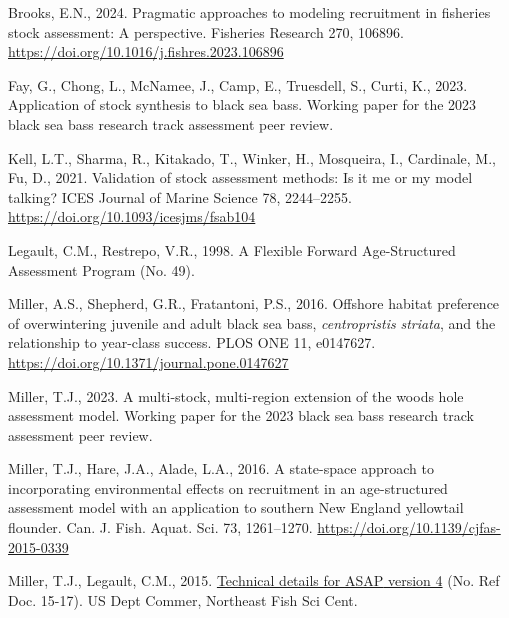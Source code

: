 \documentclass[
]{article}
\newlength{\cslhangindent}
\newlength{\cslentryspacingunit} %
\newenvironment{CSLReferences}[2] %
 {%
  \setlength{\parindent}{0pt}
  \ifodd #1
  \let\oldpar\par
  \def\par{\hangindent=\cslhangindent\oldpar}
  \fi
  \setlength{\parskip}{#2\cslentryspacingunit}
 }%
 {}
\begin{document}
\hypertarget{refs}{}
\begin{CSLReferences}{1}{0}
\leavevmode{}%
Brooks, E.N., 2024. Pragmatic approaches to modeling recruitment in fisheries stock assessment: A perspective. Fisheries Research 270, 106896. \url{https://doi.org/10.1016/j.fishres.2023.106896}

\leavevmode{}%
Fay, G., Chong, L., McNamee, J., Camp, E., Truesdell, S., Curti, K., 2023. Application of stock synthesis to black sea bass. Working paper for the 2023 black sea bass research track assessment peer review.

\leavevmode{}%
Kell, L.T., Sharma, R., Kitakado, T., Winker, H., Mosqueira, I., Cardinale, M., Fu, D., 2021. Validation of stock assessment methods: Is it me or my model talking? ICES Journal of Marine Science 78, 2244--2255. \url{https://doi.org/10.1093/icesjms/fsab104}

\leavevmode{}%
Legault, C.M., Restrepo, V.R., 1998. A {Flexible Forward Age}-{Structured Assessment Program} (No. 49).

\leavevmode{}%
Miller, A.S., Shepherd, G.R., Fratantoni, P.S., 2016. Offshore habitat preference of overwintering juvenile and adult black sea bass, \emph{centropristis} \emph{striata}, and the relationship to year-class success. {PLOS} {ONE} 11, e0147627. \url{https://doi.org/10.1371/journal.pone.0147627}

\leavevmode{}%
Miller, T.J., 2023. A multi-stock, multi-region extension of the woods hole assessment model. Working paper for the 2023 black sea bass research track assessment peer review.

\leavevmode{}%
Miller, T.J., Hare, J.A., Alade, L.A., 2016. A state-space approach to incorporating environmental effects on recruitment in an age-structured assessment model with an application to southern {New England} yellowtail flounder. Can. J. Fish. Aquat. Sci. 73, 1261--1270. \url{https://doi.org/10.1139/cjfas-2015-0339}

\leavevmode{}%
Miller, T.J., Legault, C.M., 2015. \href{https://doi:10.7289/V57W695G}{Technical details for {ASAP} version 4} (No. Ref Doc. 15-17). {US Dept Commer, Northeast Fish Sci Cent}.


\end{CSLReferences}
\end{document}
